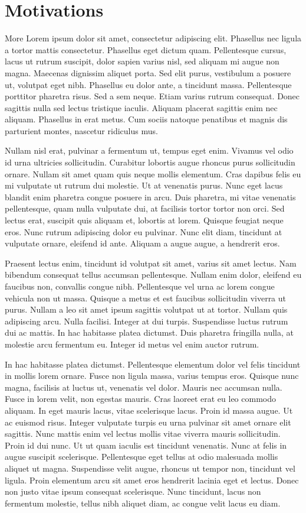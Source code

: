 \section{Motivations}
More Lorem ipsum dolor sit amet, consectetur adipiscing elit. Phasellus nec ligula a tortor mattis
consectetur. Phasellus eget dictum quam. Pellentesque cursus, lacus ut rutrum suscipit, dolor sapien varius nisl, sed
aliquam mi augue non magna. Maecenas dignissim aliquet porta. Sed elit purus, vestibulum a posuere ut, volutpat eget
nibh. Phasellus eu dolor ante, a tincidunt massa. Pellentesque porttitor pharetra risus. Sed a sem neque. Etiam varius
rutrum consequat. Donec sagittis nulla sed lectus tristique iaculis. Aliquam placerat sagittis enim nec
aliquam. Phasellus in erat metus. Cum sociis natoque penatibus et magnis dis parturient montes, nascetur ridiculus mus.

Nullam nisl erat, pulvinar a fermentum ut, tempus eget enim. Vivamus vel odio id urna ultricies sollicitudin. Curabitur
lobortis augue rhoncus purus sollicitudin ornare. Nullam sit amet quam quis neque mollis elementum. Cras dapibus felis
eu mi vulputate ut rutrum dui molestie. Ut at venenatis purus. Nunc eget lacus blandit enim pharetra congue posuere in
arcu. Duis pharetra, mi vitae venenatis pellentesque, quam nulla vulputate dui, at facilisis tortor tortor non orci. Sed
lectus erat, suscipit quis aliquam et, lobortis at lorem. Quisque feugiat neque eros. Nunc rutrum adipiscing dolor eu
pulvinar. Nunc elit diam, tincidunt at vulputate ornare, eleifend id ante. Aliquam a augue augue, a hendrerit eros.

Praesent lectus enim, tincidunt id volutpat sit amet, varius sit amet lectus. Nam bibendum consequat tellus accumsan
pellentesque. Nullam enim dolor, eleifend eu faucibus non, convallis congue nibh. Pellentesque vel urna ac lorem congue
vehicula non ut massa. Quisque a metus et est faucibus sollicitudin viverra ut purus. Nullam a leo sit amet ipsum
sagittis volutpat ut at tortor. Nullam quis adipiscing arcu. Nulla facilisi. Integer at dui turpis. Suspendisse luctus
rutrum dui ac mattis. In hac habitasse platea dictumst. Duis pharetra fringilla nulla, at molestie arcu fermentum
eu. Integer id metus vel enim auctor rutrum.

In hac habitasse platea dictumst. Pellentesque elementum dolor vel felis tincidunt in mollis lorem ornare. Fusce non
ligula massa, varius tempus eros. Quisque nunc magna, facilisis at luctus ut, venenatis vel dolor. Mauris nec accumsan
nulla. Fusce in lorem velit, non egestas mauris. Cras laoreet erat eu leo commodo aliquam. In eget mauris lacus, vitae
scelerisque lacus. Proin id massa augue. Ut ac euismod risus. Integer vulputate turpis eu urna pulvinar sit amet ornare
elit sagittis. Nunc mattis enim vel lectus mollis vitae viverra mauris sollicitudin. Proin id dui nunc. Ut ut quam
iaculis est tincidunt venenatis. Nunc at felis in augue suscipit scelerisque. Pellentesque eget tellus at odio malesuada
mollis aliquet ut magna. Suspendisse velit augue, rhoncus ut tempor non, tincidunt vel ligula. Proin elementum arcu sit
amet eros hendrerit lacinia eget et lectus. Donec non justo vitae ipsum consequat scelerisque. Nunc tincidunt, lacus non
fermentum molestie, tellus nibh aliquet diam, ac congue velit lacus eu diam.

